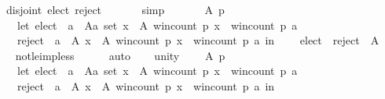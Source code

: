 \begin{isabellebody}
\ \ \ \ disjoint{}\ {\isacharparenleft}{\kern0pt}elect{\isacharcomma}{\kern0pt}\ reject{\isacharcomma}{\kern0pt}\ {\isacharbraceleft}{\kern0pt}{\isacharbraceright}{\kern0pt}{\isacharparenright}{\kern0pt}{\isachardoublequoteclose}\isanewline
\ \ \ \ \isamarkupfalse%
\ simp\isanewline
\ \ \isamarkupfalse%
\isanewline
\ \ \ \ {\isachardoublequoteopen}{\isasymforall}A\ p{\isachardot}{\kern0pt}\isanewline
\ \ \ \ \ \ let\ elect\ {\isacharequal}{\kern0pt}\ {\isacharbraceleft}{\kern0pt}a\ {\isasymin}\ {\isacharparenleft}{\kern0pt}A{\isacharcolon}{\kern0pt}{\isacharcolon}{\kern0pt}{\isacharprime}{\kern0pt}a\ set{\isacharparenright}{\kern0pt}{\isachardot}{\kern0pt}\ {\isasymforall}x\ {\isasymin}\ A{\isachardot}{\kern0pt}\ win{\isacharunderscore}{\kern0pt}count\ p\ x\ {\isasymle}\ win{\isacharunderscore}{\kern0pt}count\ p\ a{\isacharbraceright}{\kern0pt}{\isacharsemicolon}{\kern0pt}\isanewline
\ \ \ \ \ \ reject\ {\isacharequal}{\kern0pt}\ {\isacharbraceleft}{\kern0pt}a\ {\isasymin}\ A{\isachardot}{\kern0pt}\ {\isasymexists}x\ {\isasymin}\ A{\isachardot}{\kern0pt}\ win{\isacharunderscore}{\kern0pt}count\ p\ x\ {\isachargreater}{\kern0pt}\ win{\isacharunderscore}{\kern0pt}count\ p\ a{\isacharbraceright}{\kern0pt}\ in\isanewline
\ \ \ \ elect\ {\isasymunion}\ reject\ {\isacharequal}{\kern0pt}\ A{\isachardoublequoteclose}\isanewline
\ \ \ \ \isamarkupfalse%
\ not{\isacharunderscore}{\kern0pt}le{\isacharunderscore}{\kern0pt}imp{\isacharunderscore}{\kern0pt}less\isanewline
\ \ \ \ \isamarkupfalse%
\ auto\isanewline
\ \ \isamarkupfalse%
\ unity{\isacharcolon}{\kern0pt}\isanewline
\ \ \ \ {\isachardoublequoteopen}{\isasymforall}A\ p{\isachardot}{\kern0pt}\isanewline
\ \ \ \ \ \ let\ elect\ {\isacharequal}{\kern0pt}\ {\isacharbraceleft}{\kern0pt}a\ {\isasymin}\ {\isacharparenleft}{\kern0pt}A{\isacharcolon}{\kern0pt}{\isacharcolon}{\kern0pt}{\isacharprime}{\kern0pt}a\ set{\isacharparenright}{\kern0pt}{\isachardot}{\kern0pt}\ {\isasymforall}x\ {\isasymin}\ A{\isachardot}{\kern0pt}\ win{\isacharunderscore}{\kern0pt}count\ p\ x\ {\isasymle}\ win{\isacharunderscore}{\kern0pt}count\ p\ a{\isacharbraceright}{\kern0pt}{\isacharsemicolon}{\kern0pt}\isanewline
\ \ \ \ \ \ reject\ {\isacharequal}{\kern0pt}\ {\isacharbraceleft}{\kern0pt}a\ {\isasymin}\ A{\isachardot}{\kern0pt}\ {\isasymexists}x\ {\isasymin}\ A{\isachardot}{\kern0pt}\ win{\isacharunderscore}{\kern0pt}count\ p\ x\ {\isachargreater}{\kern0pt}\ win{\isacharunderscore}{\kern0pt}count\ p\ a{\isacharbraceright}{\kern0pt}\ in\isanewline

\end{isabellebody}
